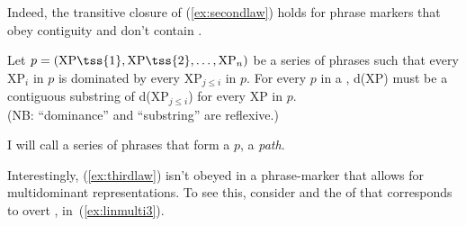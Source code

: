 \documentclass[output=paper]{langsci/langscibook}
\begin{document}
Indeed, the transitive closure of (\ref{ex:secondlaw}) holds for phrase markers that obey contiguity and don't contain .
\begin{exe}
	\ex \label{ex:thirdlaw}
	Let $p=(\text{XP\tss{1}}, \text{XP\tss{2}},\ldots,\text{XP}_n)$ be a series of phrases such that every XP$_i$ in $p$ is dominated by every XP$_{j \leq i}$ in $p$. For every $p$ in a , d(XP) must be a contiguous substring of d(XP$_{j \leq i}$) for every XP in $p$.\\[8pt]
	(NB: ``dominance'' and ``substring'' are reflexive.)
\end{exe}
I will call a series of phrases that form a $p$, a \emph{path}.

Interestingly, (\ref{ex:thirdlaw}) isn't obeyed in a phrase-marker that allows
for multidominant representations. To see this, consider  and
the  of  that corresponds to overt ,
in~(\ref{ex:linmulti3}).
\end{document}
